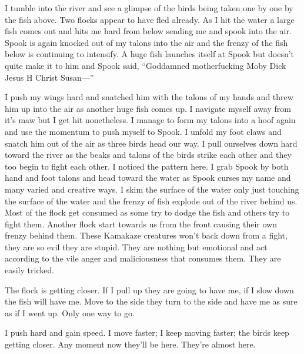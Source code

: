 I tumble into the river and see a glimpse of the birds being taken one by one by the fish above. Two flocks appear to have fled already. As I hit the water a large fish comes out and hits me hard from below sending me and spook into the air. Spook is again knocked out of my talons into the air and the frenzy of the fish below is continuing to intensify. A huge fish launches itself at Spook but doesn't quite make it to him and Spook said, ``Goddamned motherfucking Moby Dick Jesus H Christ Susan---''

I push my wings hard and snatched him with the talons of my hands and threw him up into the air as another huge fish comes up. I navigate myself away from it's maw but I get hit nonetheless. I manage to form my talons into a hoof again and use the momentum to push myself to Spook. I unfold my foot claws and snatch him out of the air as three birds head our way. I pull ourselves down hard toward the river as the beaks and talons of the birds strike each other and they too begin to fight each other. I noticed the pattern here. I grab Spook by both hand and foot talons and head toward the water as Spook curses my name and many varied and creative ways. I skim the surface of the water only just touching the surface of the water and the frenzy of fish explode out of the river behind us. Most of the flock get consumed as some try to dodge the fish and others try to fight them. Another flock start towards us from the front causing their own frenzy behind them. These Kamakaze creatures won't back down from a fight, they are so evil they are stupid. They are nothing but emotional and act according to the vile anger and maliciousness that consumes them. They are easily tricked.

The flock is getting closer. If I pull up they are going to have me, if I slow down the fish will have me. Move to the side they turn to the side and have me as sure as if I went up. Only one way to go.

I push hard and gain speed. I move faster; I keep moving faster; the birds keep getting closer. Any moment now they'll be here. They're almost here.


